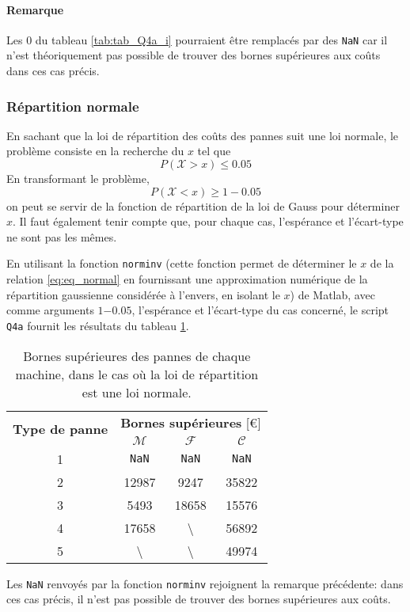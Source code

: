 \documentclass[a4paper, 12pt]{article}
\newcommand{\M}{\mathcal{M}}
\newcommand{\F}{\mathcal{F}}
\newcommand{\C}{\mathcal{C}}
\newcommand{\X}{\mathcal{X}}
\begin{document}
	\paragraph{Remarque} Les \(0\) du tableau \ref{tab:tab_Q4a_i} pourraient être remplacés par des \texttt{NaN} car il n'est théoriquement pas possible de trouver des bornes supérieures aux coûts dans ces cas précis.
	\subsubsection{Répartition normale}
	En sachant que la loi de répartition des coûts des pannes suit une loi normale, le problème consiste en la recherche du \(x\) tel que
	\begin{displaymath}
	    P\left(\X > x\right)\leq\num{0.05}
	\end{displaymath}
	En transformant le problème,
	\begin{equation}
	    \label{eq:eq_normal}
	    P\left(\X < x\right)\geq 1-\num{0.05}
	\end{equation}
	on peut se servir de la fonction de répartition de la loi de Gauss pour déterminer \(x\). Il faut également tenir compte que, pour chaque cas, l'espérance et l'écart-type ne sont pas les mêmes.\par
	En utilisant la fonction \texttt{norminv} (cette fonction permet de déterminer le \(x\) de la relation \eqref{eq:eq_normal} en fournissant une approximation numérique de la répartition gaussienne considérée \og à l'envers\fg{}, \cad en isolant le \(x\)) de Matlab, avec comme arguments \(\num{1-0.05}\), l'espérance et l'écart-type du cas concerné, le script \texttt{Q4a} fournit les résultats du tableau \ref{tab:tab_Q4a_ii}.\par
	\begin{table}[!ht]
	    \centering
	    \begin{tabular}{|c|c|c|c|}
	        \hline
	        \multirow{2}{*}{\textbf{Type de panne}} & \multicolumn{3}{c|}{\textbf{Bornes supérieures} [\euro{}]}\\ \cline{2-4}
	        & \(\bm{\M}\) & \(\bm{\F}\) & \(\bm{\C}\)\\
	        \hline
	        \hline
	        1 & \texttt{NaN} & \texttt{NaN} & \texttt{NaN}\\
	        \hline
	        2 & \num{12987} & \num{9247} & \num{35822}\\
	        \hline
	        3 & \num{5493} & \num{18658} & \num{15576}\\
	        \hline
	        4 & \num{17658} & \textbackslash & \num{56892}\\
	        \hline
	        5 & \textbackslash & \textbackslash & \num{49974}\\
	        \hline
	    \end{tabular}
	    \caption{Bornes supérieures des pannes de chaque machine, dans le cas où la loi de répartition est une loi normale.}
	    \label{tab:tab_Q4a_ii}
	\end{table}
	Les \texttt{NaN} renvoyés par la fonction \texttt{norminv} rejoignent la remarque précédente: dans ces cas précis, il n'est pas possible de trouver des bornes supérieures aux coûts.
\end{document}
